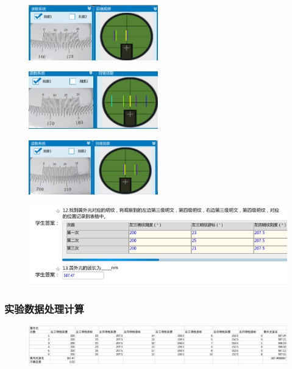 \documentclass{article}
\begin{document}
    \begin{figure}[H]
        \centering
        \includegraphics[width=0.5\textwidth]{20.png}
        \end{figure}
        \begin{figure}[H]
            \centering
            \includegraphics[width=0.5\textwidth]{21.png}
            \end{figure}

            \begin{figure}[H]
                \centering
                \includegraphics[width=0.5\textwidth]{22.png}
                \end{figure}
                \begin{figure}[H]
                    \centering
                    \includegraphics[width=1\textwidth]{34.png}
                    \end{figure}
    
\subsubsection*{实验数据处理计算}
\begin{figure}[H]
    \centering
    \includegraphics[width=1\textwidth]{10.png}
    \end{figure}
\end{document}
